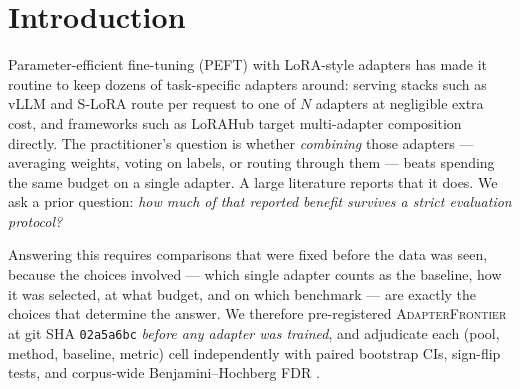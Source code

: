 \documentclass[11pt]{article}
\begin{document}
\section{Introduction}

Parameter-efficient fine-tuning (PEFT) with LoRA-style adapters \citep{hu2021lora} has made it routine to keep dozens of task-specific adapters around: serving stacks such as vLLM and S-LoRA \citep{kwon2023efficient,sheng2024slora} route per request to one of $N$ adapters at negligible extra cost, and frameworks such as LoRAHub \citep{huang2023lorahub} target multi-adapter composition directly. The practitioner's question is whether \emph{combining} those adapters --- averaging weights, voting on labels, or routing through them --- beats spending the same budget on a single adapter. A large literature reports that it does. We ask a prior question: \emph{how much of that reported benefit survives a strict evaluation protocol?}

Answering this requires comparisons that were fixed before the data was seen, because the choices involved --- which single adapter counts as the baseline, how it was selected, at what budget, and on which benchmark --- are exactly the choices that determine the answer. We therefore pre-registered \textsc{AdapterFrontier} at git SHA \texttt{02a5a6bc} \emph{before any adapter was trained}, and adjudicate each (pool, method, baseline, metric) cell independently with paired bootstrap CIs, sign-flip tests, and corpus-wide Benjamini--Hochberg FDR \citep{bh1995}.
\end{document}
